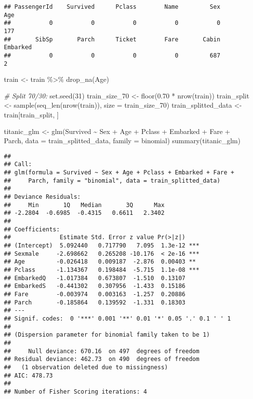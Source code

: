 \documentclass[
]{article}
\newenvironment{Shaded}{\begin{snugshade}}{\end{snugshade}}
\newcommand{\AttributeTok}[1]{\textcolor[rgb]{0.77,0.63,0.00}{#1}}
\newcommand{\CommentTok}[1]{\textcolor[rgb]{0.56,0.35,0.01}{\textit{#1}}}
\newcommand{\DecValTok}[1]{\textcolor[rgb]{0.00,0.00,0.81}{#1}}
\newcommand{\FloatTok}[1]{\textcolor[rgb]{0.00,0.00,0.81}{#1}}
\newcommand{\FunctionTok}[1]{\textcolor[rgb]{0.00,0.00,0.00}{#1}}
\newcommand{\NormalTok}[1]{#1}
\newcommand{\OtherTok}[1]{\textcolor[rgb]{0.56,0.35,0.01}{#1}}
\newcommand{\SpecialCharTok}[1]{\textcolor[rgb]{0.00,0.00,0.00}{#1}}
\newcommand{\StringTok}[1]{\textcolor[rgb]{0.31,0.60,0.02}{#1}}
\begin{document}
\begin{verbatim}
## PassengerId    Survived      Pclass        Name         Sex         Age 
##           0           0           0           0           0         177 
##       SibSp       Parch      Ticket        Fare       Cabin    Embarked 
##           0           0           0           0         687           2
\end{verbatim}

\begin{Shaded}
\begin{Highlighting}[]
\NormalTok{train }\OtherTok{\textless{}{-}}\NormalTok{ train }\SpecialCharTok{\%\textgreater{}\%} \FunctionTok{drop\_na}\NormalTok{(Age)}


\CommentTok{\# Split 70/30: }
\FunctionTok{set.seed}\NormalTok{(}\DecValTok{31}\NormalTok{)}
\NormalTok{train\_size\_70 }\OtherTok{\textless{}{-}} \FunctionTok{floor}\NormalTok{(}\FloatTok{0.70} \SpecialCharTok{*} \FunctionTok{nrow}\NormalTok{(train))}
\NormalTok{train\_split }\OtherTok{\textless{}{-}} \FunctionTok{sample}\NormalTok{(}\FunctionTok{seq\_len}\NormalTok{(}\FunctionTok{nrow}\NormalTok{(train)), }\AttributeTok{size =}\NormalTok{ train\_size\_70)}
\NormalTok{train\_splitted\_data }\OtherTok{\textless{}{-}}\NormalTok{ train[train\_split, ]}

\NormalTok{titanic\_glm }\OtherTok{\textless{}{-}} \FunctionTok{glm}\NormalTok{(Survived }\SpecialCharTok{\textasciitilde{}}\NormalTok{ Sex }\SpecialCharTok{+}\NormalTok{ Age }\SpecialCharTok{+}\NormalTok{ Pclass }\SpecialCharTok{+}\NormalTok{ Embarked  }\SpecialCharTok{+}\NormalTok{ Fare }\SpecialCharTok{+}\NormalTok{ Parch, }\AttributeTok{data =}\NormalTok{ train\_splitted\_data, }\AttributeTok{family =} \StringTok{\textquotesingle{}binomial\textquotesingle{}}\NormalTok{)}
\FunctionTok{summary}\NormalTok{(titanic\_glm)}
\end{Highlighting}
\end{Shaded}

\begin{verbatim}
## 
## Call:
## glm(formula = Survived ~ Sex + Age + Pclass + Embarked + Fare + 
##     Parch, family = "binomial", data = train_splitted_data)
## 
## Deviance Residuals: 
##     Min       1Q   Median       3Q      Max  
## -2.2804  -0.6985  -0.4315   0.6611   2.3402  
## 
## Coefficients:
##              Estimate Std. Error z value Pr(>|z|)    
## (Intercept)  5.092440   0.717790   7.095  1.3e-12 ***
## Sexmale     -2.698662   0.265208 -10.176  < 2e-16 ***
## Age         -0.026418   0.009187  -2.876  0.00403 ** 
## Pclass      -1.134367   0.198484  -5.715  1.1e-08 ***
## EmbarkedQ   -1.017384   0.673807  -1.510  0.13107    
## EmbarkedS   -0.441302   0.307956  -1.433  0.15186    
## Fare        -0.003974   0.003163  -1.257  0.20886    
## Parch       -0.185864   0.139592  -1.331  0.18303    
## ---
## Signif. codes:  0 '***' 0.001 '**' 0.01 '*' 0.05 '.' 0.1 ' ' 1
## 
## (Dispersion parameter for binomial family taken to be 1)
## 
##     Null deviance: 670.16  on 497  degrees of freedom
## Residual deviance: 462.73  on 490  degrees of freedom
##   (1 observation deleted due to missingness)
## AIC: 478.73
## 
## Number of Fisher Scoring iterations: 4
\end{verbatim}
\end{document}

